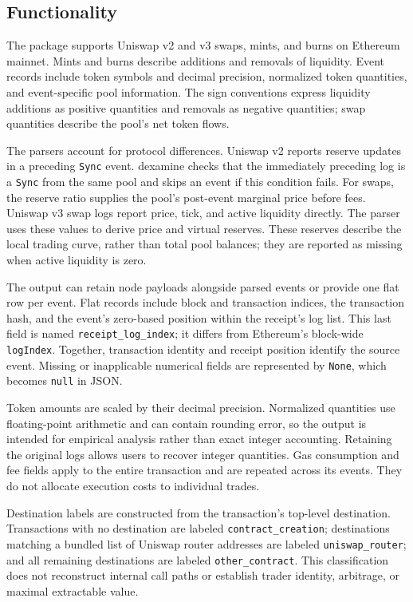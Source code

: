 \documentclass[11pt]{article}
\begin{document}
\subsection{Functionality}
The package supports Uniswap v2 and v3 swaps, mints, and burns on Ethereum mainnet.
Mints and burns describe additions and removals of liquidity. Event records include
token symbols and decimal precision, normalized token quantities, and event-specific
pool information. The sign conventions express liquidity additions as positive
quantities and removals as negative quantities; swap quantities describe the pool's
net token flows.

The parsers account for protocol differences. Uniswap v2 reports reserve updates in
a preceding \texttt{Sync} event. dexamine checks that the immediately preceding log
is a \texttt{Sync} from the same pool and skips an event if this condition fails.
For swaps, the reserve ratio supplies the pool's post-event marginal price before fees.
Uniswap v3 swap logs report price, tick, and active liquidity directly. The parser
uses these values to derive price and virtual reserves. These reserves describe the
local trading curve, rather than total pool balances; they are reported as missing
when active liquidity is zero.

The output can retain node payloads alongside parsed events or provide one flat row
per event. Flat records include block and transaction indices, the transaction hash,
and the event's zero-based position within the receipt's log list. This last field
is named \texttt{receipt\_log\_index}; it differs from Ethereum's block-wide
\texttt{logIndex}. Together, transaction identity and receipt position identify the
source event. Missing or inapplicable numerical fields are represented by
\texttt{None}, which becomes \texttt{null} in JSON.

Token amounts are scaled by their decimal precision. Normalized quantities use
floating-point arithmetic and can contain rounding error, so the output is intended
for empirical analysis rather than exact integer accounting. Retaining the original
logs allows users to recover integer quantities. Gas consumption and fee fields
apply to the entire transaction and are repeated across its events. They do not
allocate execution costs to individual trades.

Destination labels are constructed from the transaction's top-level destination.
Transactions with no destination are labeled \texttt{contract\_creation};
destinations matching a bundled list of Uniswap router addresses are
labeled \texttt{uniswap\_router}; and all remaining destinations are labeled
\texttt{other\_contract}. This classification does not reconstruct internal call
paths or establish trader identity, arbitrage, or maximal extractable value.
\end{document}
